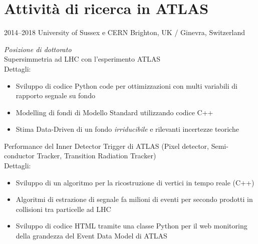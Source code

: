 \documentclass[print]{cv} %
\begin{document}


\section{Attività di ricerca in ATLAS}

\begin{entrylist}
  \entry
      {2014--2018}
      {University of Sussex e CERN}
      {Brighton, UK / Ginevra, Switzerland}
      {\emph{Posizione di dottorato}\\
      Supersimmetria ad LHC con l'esperimento ATLAS \\
      Dettagli: 
      \begin{itemize}
        \item Sviluppo di codice Python code per ottimizzazioni con multi variabili di rapporto segnale su fondo
        \item Modelling di fondi di Modello Standard utilizzando codice C++
        \item Stima Data-Driven di un fondo \emph{irriducibile} e rilevanti incertezze teoriche 
      \end{itemize}\medskip
      Performance del Inner Detector Trigger di ATLAS (Pixel detector, Semi-conductor Tracker, Transition Radiation Tracker)\\
      Dettagli: 
      \begin{itemize}
        \item Sviluppo di un algoritmo per la ricostruzione di vertici in tempo reale (C++)
        \item Algoritmi di estrazione di segnale fa milioni di eventi per secondo prodotti in collisioni tra particelle ad LHC 
        \item Sviluppo di codice HTML tramite una classe Python per il web monitoring della grandezza del Event Data Model di ATLAS
      \end{itemize}      
      }
\end{entrylist}
\end{document}
